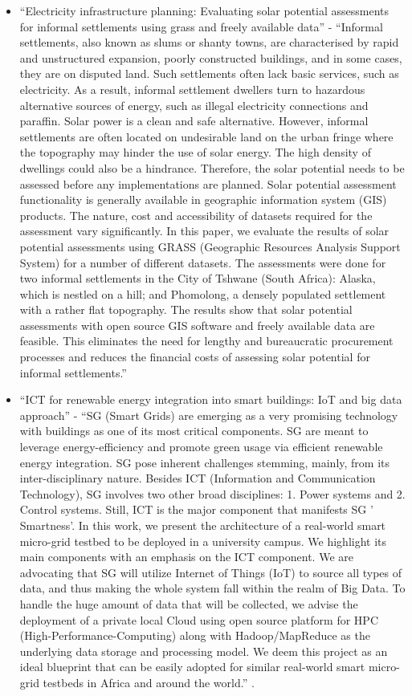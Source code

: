 \documentclass[conference, a4paper]{IEEEtran}
\begin{document}
\begin{itemize}
\item ``Electricity infrastructure planning: Evaluating solar potential assessments for informal settlements using grass and freely available data'' - ``Informal settlements, also known as slums or shanty towns, are characterised by rapid and unstructured expansion, poorly constructed buildings, and in some cases, they are on disputed land. Such settlements often lack basic services, such as electricity. As a result, informal settlement dwellers turn to hazardous alternative sources of energy, such as illegal electricity connections and paraffin. Solar power is a clean and safe alternative. However, informal settlements are often located on undesirable land on the urban fringe where the topography may hinder the use of solar energy. The high density of dwellings could also be a hindrance. Therefore, the solar potential needs to be assessed before any implementations are planned. Solar potential assessment functionality is generally available in geographic information system (GIS) products. The nature, cost and accessibility of datasets required for the assessment vary significantly. In this paper, we evaluate the results of solar potential assessments using GRASS (Geographic Resources Analysis Support System) for a number of different datasets. The assessments were done for two informal settlements in the City of Tshwane (South Africa): Alaska, which is nestled on a hill; and Phomolong, a densely populated settlement with a rather flat topography. The results show that solar potential assessments with open source GIS software and freely available data are feasible. This eliminates the need for lengthy and bureaucratic procurement processes and reduces the financial costs of assessing solar potential for informal settlements.'' \cite{hassim-coetzee-ea-2018}

\item ``ICT for renewable energy integration into smart buildings: IoT and big data approach'' - ``SG (Smart Grids) are emerging as a very promising technology with buildings as one of its most critical components. SG are meant to leverage energy-efficiency and promote green usage via efficient renewable energy integration. SG pose inherent challenges stemming, mainly, from its inter-disciplinary nature. Besides ICT (Information and Communication Technology), SG involves two other broad disciplines: 1. Power systems and 2. Control systems. Still, ICT is the major component that manifests SG ' Smartness'. In this work, we present the architecture of a real-world smart micro-grid testbed to be deployed in a university campus. We highlight its main components with an emphasis on the ICT component. We are advocating that SG will utilize Internet of Things (IoT) to source all types of data, and thus making the whole system fall within the realm of Big Data. To handle the huge amount of data that will be collected, we advise the deployment of a private local Cloud using open source platform for HPC (High-Performance-Computing) along with Hadoop/MapReduce as the underlying data storage and processing model. We deem this project as an ideal blueprint that can be easily adopted for similar real-world smart micro-grid testbeds in Africa and around the world.'' \cite{abid-lghoul-ea-2017}.
  

\end{itemize}
\end{document}
